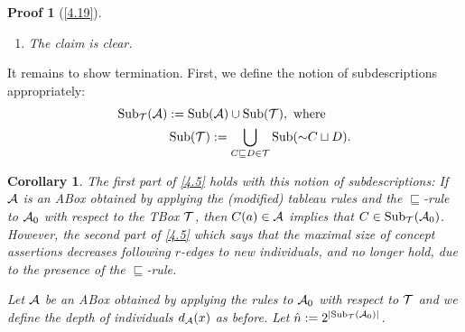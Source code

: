 \documentclass[openany]{scrbook}
\theoremstyle{break}
\newtheorem{Corollary}[Theorem]{Corollary}
\theoremstyle{nonumberbreak}
\theoremstyle{nonumberplain}
\theoremstyle{nonumberbreak}
\newtheorem{Proof}{Proof}
\newcommand{\then}{\Longrightarrow}
\newcommand{\abs}[2][]{\left|{#2}\right|\ifx#1\then\else_{#1}\fi}
\newcommand{\ie}{i{.}\,e{.}\xspace}
\newcommand{\Sub}{\operatorname{Sub}}
\newcommand{\nnf}{\mathop{\sim\!}}
\begin{document}
\begin{Proof}[\cref{4.19}]
\begin{enumerate}
    blocked, and thus $r(x, y) \in \hat{\cal A} \subseteq {\cal A}$
    implies $(x, y) \in r^{I_{\cal A}}$. For $C(x) \in \hat{\cal A}$,
    we show $x \in C^{I_{\cal A}}$ by induction on the structure of
    $C$. The only interesting case (that differs from the proof of
    \cref{4.2}) is the one where $C = \exists r.D$.
    \begin{enumerate}
    \item If $x$ is not blocked, then we can proceed as in the proof
      of \cref{4.2}.
    \item Otherwise, let $a$ be the individual blocking $x$ chosen in
      the definition of $I_{\cal A}$. We have $(\exists r.D)(a) \in
      \hat{\cal A}$, and since $a$ is not blocked, we proceed as
      above.
    \end{enumerate}
    This yields $a \in (\exists r.D)^{I_{\cal A}}$, \ie there is $y
    \in \Delta^{I_{\cal A}}$ such that $(a, y) \in r^{I_{\cal A}}$ and
    $y \in D^{I_{\cal A}}$. By the definition of the canonical
    interpretation, we also have $(x, y) \in r^{I_{\cal A}}$. This
    shows $x \in (\exists r.D)^{I_{\cal A}}$.
  \item The claim is clear.
  \end{enumerate}
\end{Proof}

It remains to show termination. First, we define the notion of
subdescriptions appropriately:
\begin{align*}
  \Sub_{\cal T}({\cal A}) & := \Sub({\cal A}) \cup \Sub({\cal T}),\
  \text{where} \\
  & \Sub({\cal T}) := \bigcup_{C \sqsubseteq D \in {\cal T}}{\Sub(\nnf
    C \sqcup D)}.
\end{align*}

\begin{Corollary}
  \label{4.20}
  The first part of \cref{4.5} holds with this notion of
  subdescriptions: If ${\cal A}$ is an ABox obtained by applying the
  (modified) tableau rules and the $\sqsubseteq$-rule to ${\cal A}_0$
  with respect to the TBox ${\cal T}$, then $C(a) \in {\cal A}$
  implies that $C \in \Sub_{\cal T}({\cal A}_0)$. However, the second
  part of \cref{4.5} which says that the maximal size of concept
  assertions decreases following $r$-edges to new individuals, and no
  longer hold, due to the presence of the $\sqsubseteq$-rule.

  Let ${\cal A}$ be an ABox obtained by applying the rules to ${\cal
    A}_0$ with respect to ${\cal T}$ and we define the depth of
  individuals $d_{\cal A}(x)$ as before. Let $\hat{n} :=
  2^{\abs{\Sub_{\cal T}({\cal A}_0)}}$.
\end{Corollary}
\end{document}
